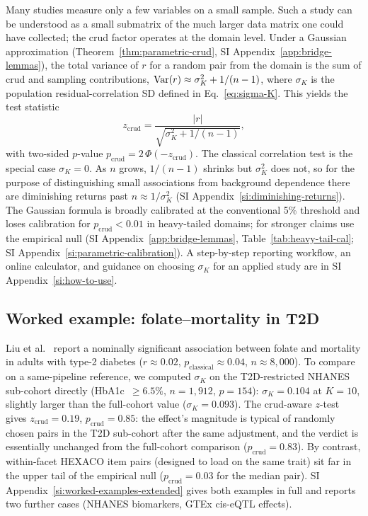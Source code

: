 Many studies measure only a few variables on a small sample. Such a study can be understood as a small submatrix of the much larger data matrix one could have collected; the crud factor operates at the domain level. Under a Gaussian approximation (Theorem~\ref{thm:parametric-crud}, SI Appendix~\ref{app:bridge-lemmas}), the total variance of $r$ for a random pair from the domain is the sum of crud and sampling contributions, $\operatorname{Var}(r) \approx \sigma_K^2 + 1/(n-1)$, where $\sigma_K$ is the population residual-correlation SD defined in Eq.~\ref{eq:sigma-K}. This yields the test statistic
\begin{equation}\label{eq:z-crud-main}
z_{\mathrm{crud}} = \frac{|r|}{\sqrt{\sigma_K^2 + 1/(n-1)}},
\end{equation}
with two-sided $p$-value $p_{\mathrm{crud}} = 2\,\Phi(-z_{\mathrm{crud}})$. The classical correlation test is the special case $\sigma_K=0$. As $n$ grows, $1/(n-1)$ shrinks but $\sigma_K^2$ does not, so for the purpose of distinguishing small associations from background dependence there are diminishing returns past $n \approx 1/\sigma_K^2$ (SI Appendix~\ref{si:diminishing-returns}). The Gaussian formula is broadly calibrated at the conventional 5\% threshold and loses calibration for $p_{\mathrm{crud}}<0.01$ in heavy-tailed domains; for stronger claims use the empirical null (SI Appendix~\ref{app:bridge-lemmas}, Table~\ref{tab:heavy-tail-cal}; SI Appendix~\ref{si:parametric-calibration}). A step-by-step reporting workflow, an online calculator, and guidance on choosing $\sigma_K$ for an applied study are in SI Appendix~\ref{si:how-to-use}.

\subsection{Worked example: folate--mortality in T2D}
\label{sec:worked-examples}

Liu et al.\ \citep{liu2022} report a nominally significant association between folate and mortality in adults with type-2 diabetes ($r \approx 0.02$, $p_{\mathrm{classical}} \approx 0.04$, $n \approx 8{,}000$). To compare on a same-pipeline reference, we computed $\sigma_K$ on the T2D-restricted NHANES sub-cohort directly (HbA1c~$\ge 6.5\%$, $n=1{,}912$, $p=154$): $\sigma_K=0.104$ at $K=10$, slightly larger than the full-cohort value ($\sigma_K=0.093$). The crud-aware $z$-test gives $z_{\mathrm{crud}}=0.19$, $p_{\mathrm{crud}}=0.85$: the effect's magnitude is typical of randomly chosen pairs in the T2D sub-cohort after the same adjustment, and the verdict is essentially unchanged from the full-cohort comparison ($p_{\mathrm{crud}}=0.83$). By contrast, within-facet HEXACO item pairs (designed to load on the same trait) sit far in the upper tail of the empirical null ($p_{\mathrm{crud}}=0.03$ for the median pair). SI Appendix~\ref{si:worked-examples-extended} gives both examples in full and reports two further cases (NHANES biomarkers, GTEx cis-eQTL effects).
